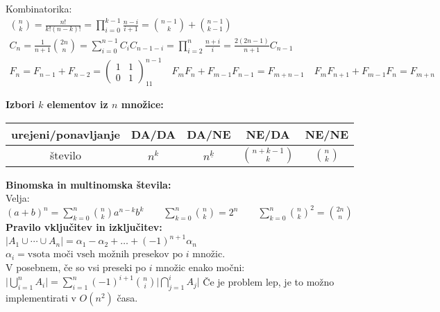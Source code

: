 \documentclass[a4paper,oneside,12pt]{article}
\newenvironment{description*}%
{
\begin{description}
\setlength{\itemsep}{0pt}
\setlength{\parskip}{2pt}
}
{\end{description}}
\begin{document}
\begin{description*}
  \item[Kombinatorika:]
    \begin{gather*}
      \binom{n}{k} = \frac{n!}{k!(n-k)!} = \prod_{i=0}^{k-1} \frac{n-i}{i+1} = \binom{n-1}{k} + \binom{n-1}{k-1} \\
      C_n = \frac{1}{n+1}\binom{2n}{n} = \sum_{i=0}^{n-1}C_iC_{n-1-i} = \prod_{i=2}^n\frac{n+i}{i} = \frac{2(2n-1)}{n+1}C_{n-1} \\
      F_n = F_{n-1} + F_{n-2} = \begin{pmatrix} 1 & 1 \\ 0 & 1
      \end{pmatrix}^{n-1}_{11}\quad F_mF_n + F_{m-1}F_{n-1}  = F_{m+n-1} \quad
      F_mF_{n+1} + F_{m-1}F_n = F_{m+n}
    \end{gather*}

    \textbf{Izbori $k$ elementov iz $n$ množice:} \\[6pt]
    \begin{tabular}[h]{|c|c|c|c|c|}
      \hline
      urejeni/ponavljanje & DA/DA & DA/NE & NE/DA & NE/NE \\ \hline
      število & $n^k$ & $n^{\underline{k}}$ & $\binom{n+k-1}{k}$ & $\binom{n}{k}$ \\ \hline
    \end{tabular}

    \textbf{Binomska in multinomska števila:} \\
    Velja: $(a+b)^n = \sum_{k=0}^n\binom{n}{k}a^{n-k}b^k \qquad \sum_{k=0}^n\binom{n}{k} =
    2^n \qquad \sum_{k=0}^n\binom{n}{k}^2 = \binom{2n}{n}$ \\

    \textbf{Pravilo vključitev in izključitev:} $|A_1 \cup \cdots \cup A_n| = \alpha_1 - \alpha_2 + \dots +
    (-1)^{n+1}\alpha_n$ \\
    $\alpha_i = \text{vsota moči vseh možnih presekov po $i$ množic}$. \\
    V posebnem, če so vsi preseki po $i$ množic enako močni:
    $\lvert\bigcup_{i=1}^nA_i\rvert = \sum_{i=1}^n (-1)^{i+1}\binom{n}{i}\lvert\bigcap_{j=1}^iA_j\rvert$
    Če je problem lep, je to možno implementirati v $O(n^2)$ časa.



\end{description*}
\end{document}
